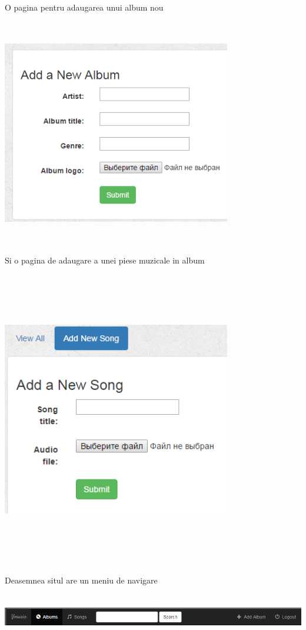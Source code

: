 \documentclass[a4paper, 12pt]{article}
\begin{document}
O pagina pentru adaugarea unui album nou

\includegraphics*[width=10cm, height=10cm]{album}

Si o pagina de adaugare a unei piese muzicale in album

\includegraphics*[width=10cm, height=13cm]{song}

Deasemnea situl are un meniu de navigare 

\includegraphics*[width=15cm, height=2cm]{menu}
\end{document}
